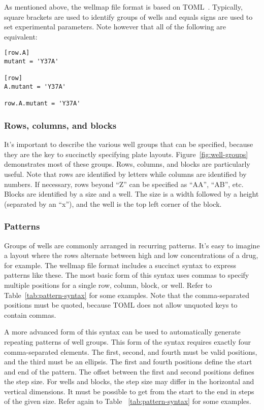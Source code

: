 \documentclass[twocolumn]{bmcart}
\begin{document}
As mentioned above, the wellmap file format is based on
TOML~\cite{preston-werner2020}.  Typically, square brackets are used to
identify groups of wells and equals signs are used to set experimental
parameters. Note however that all of the following are equivalent:

\begin{lstlisting}
[row.A]
mutant = 'Y37A'

[row]
A.mutant = 'Y37A'

row.A.mutant = 'Y37A'
\end{lstlisting}


\subsubsection*{Rows, columns, and blocks}

It's important to describe the various well groups that can be specified,
because they are the key to succinctly specifying plate layouts.
Figure~\ref{fig:well-groups} demonstrates most of these groups. Rows, columns,
and blocks are particularly useful. Note that rows are identified by letters
while columns are identified by numbers. If necessary, rows beyond ``Z'' can be
specified as ``AA'', ``AB'', etc. Blocks are identified by a size and a well.
The size is a width followed by a height (separated by an ``x''), and the well
is the top left corner of the block.

\subsubsection*{Patterns}

Groups of wells are commonly arranged in recurring patterns. It's easy to
imagine a layout where the rows alternate between high and low concentrations
of a drug, for example. The wellmap file format includes a succinct syntax to
express patterns like these. The most basic form of this syntax uses commas to
specify multiple positions for a single row, column, block, or well. Refer to
Table~\ref{tab:pattern-syntax} for some examples. Note that the comma-separated
positions must be quoted, because TOML does not allow unquoted keys to contain
commas.

A more advanced form of this syntax can be used to automatically generate
repeating patterns of well groups. This form of the syntax requires exactly
four comma-separated elements. The first, second, and fourth must be valid
positions, and the third must be an ellipsis. The first and fourth positions
define the start and end of the pattern. The offset between the first and
second positions defines the step size.  For wells and blocks, the step size
may differ in the horizontal and vertical dimensions. It must be possible to
get from the start to the end in steps of the given size. Refer again to Table
~\ref{tab:pattern-syntax} for some examples.
\end{document}
